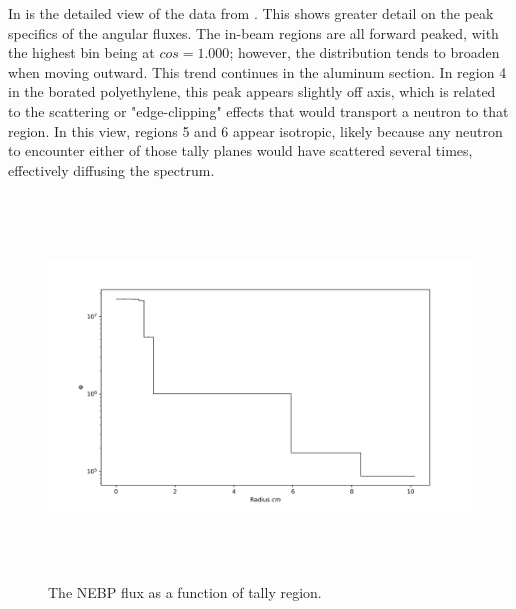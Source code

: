 In  is the detailed view of the data from .
This shows greater detail on the peak specifics of the angular fluxes.
The in-beam regions are all forward peaked, with the highest bin being at $cos=1.000$; however, the distribution tends to broaden when moving outward.
This trend continues in the aluminum section.
In region 4 in the borated polyethylene, this peak appears slightly off axis, which is related to the scattering or "edge-clipping" effects that would transport a neutron to that region.
In this view, regions 5 and 6 appear isotropic, likely because any neutron to encounter either of those tally planes would have scattered several times, effectively diffusing the spectrum.


\begin{figure}[htb]
\centering
\includegraphics[height=4in]{tex/figures/flux_rad.png}
\caption[Regional Flux]{The NEBP flux as a function of tally region.}
\label{fig:flux_rad}
\end{figure}


